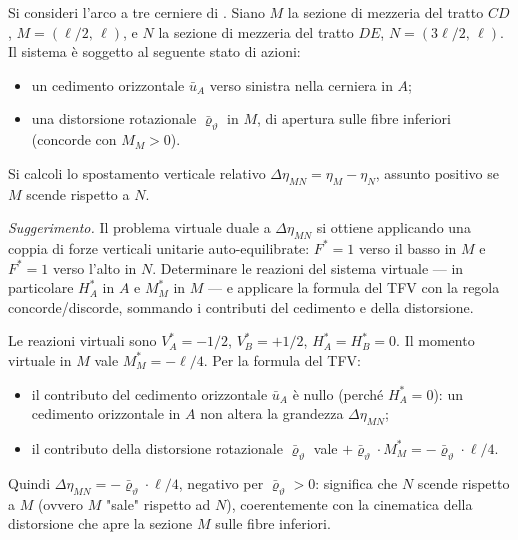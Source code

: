 \begin{esercizio}
	\label{ex:TFV_relativo_arco}
	
	Si consideri l'arco a tre cerniere di
	. Siano $M$ la sezione di mezzeria del
	tratto $CD$, $M = (\ell/2,\,\ell)$, e $N$ la sezione di
	mezzeria del tratto $DE$, $N = (3\ell/2,\,\ell)$. Il sistema è
	soggetto al seguente stato di azioni:
	\begin{itemize}[noitemsep,topsep=2pt]
		\item un cedimento orizzontale $\bar u_A$ verso sinistra
		nella cerniera in $A$;
		\item una distorsione rotazionale $\bar\varrho_\vartheta$
		in $M$, di apertura sulle fibre inferiori (concorde con
		$M_M > 0$).
	\end{itemize}
	Si calcoli lo spostamento verticale relativo
	$\Delta\eta_{MN} = \eta_M - \eta_N$, assunto positivo se $M$
	scende rispetto a $N$.
	
	\textit{Suggerimento.} Il problema virtuale duale a 
	$\Delta\eta_{MN}$ si ottiene applicando una coppia di forze
	verticali unitarie auto-equilibrate: $F^* = 1$ verso il basso
	in $M$ e $F^* = 1$ verso l'alto in $N$. Determinare le
	reazioni del sistema virtuale --- in particolare $H_A^*$ in 
	$A$ e $M_M^*$ in $M$ --- e applicare la formula del TFV con
	la regola concorde/discorde, sommando i contributi del
	cedimento e della distorsione.
	
	\risultato Le reazioni virtuali sono $V_A^* = -1/2$, 
	$V_B^* = +1/2$, $H_A^* = H_B^* = 0$. Il momento virtuale in 
	$M$ vale $M_M^* = -\ell/4$. Per la formula del TFV:
	\begin{itemize}[noitemsep,topsep=2pt]
		\item il contributo del cedimento orizzontale $\bar u_A$ 
		è nullo (perché $H_A^* = 0$): un cedimento orizzontale in 
		$A$ non altera la grandezza $\Delta\eta_{MN}$;
		\item il contributo della distorsione rotazionale 
		$\bar\varrho_\vartheta$ vale 
		$+\bar\varrho_\vartheta \cdot M_M^* = -\bar\varrho_\vartheta \cdot \ell/4$.
	\end{itemize}
	Quindi $\Delta\eta_{MN} = -\bar\varrho_\vartheta \cdot \ell/4$,
	negativo per $\bar\varrho_\vartheta > 0$: significa che $N$
	scende rispetto a $M$ (ovvero $M$ "sale" rispetto ad $N$),
	coerentemente con la cinematica della distorsione che apre la
	sezione $M$ sulle fibre inferiori.
	
\end{esercizio}